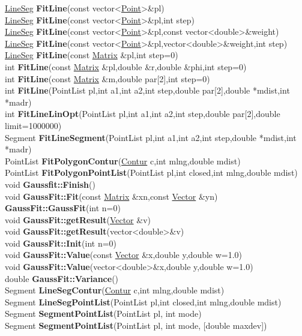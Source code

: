 \documentclass[10pt,titlepage]{article}
\def\functionlistentry#1#2#3#4#5#6{\noindent #1 {\bf #2}(#3) \dotfill #6\\}
\begin{document}
{{\functionlistentry{\hyperlink{LineSeg}{LineSeg}}{FitLine}{const vector\textless {}\hyperlink{Point}{Point}\textgreater  \&pl}{1159}{fitting}{}
\functionlistentry{\hyperlink{LineSeg}{LineSeg}}{FitLine}{const vector\textless {}\hyperlink{Point}{Point}\textgreater  \&pl,int step}{1160}{fitting}{}
\functionlistentry{\hyperlink{LineSeg}{LineSeg}}{FitLine}{const vector\textless {}\hyperlink{Point}{Point}\textgreater  \&pl,const vector\textless {}double\textgreater  \&weight}{1161}{fitting}{}
\functionlistentry{\hyperlink{LineSeg}{LineSeg}}{FitLine}{const vector\textless {}\hyperlink{Point}{Point}\textgreater  \&pl,vector\textless {}double\textgreater  \&weight,int step}{1162}{fitting}{}
\functionlistentry{\hyperlink{LineSeg}{LineSeg}}{FitLine}{const \hyperlink{Matrix}{Matrix} \&pl,int step=0}{1163}{fitting}{}
\functionlistentry{int}{FitLine}{const \hyperlink{Matrix}{Matrix} \&pl,double \&r,double \&phi,int step=0}{1164}{fitting}{}
\functionlistentry{int}{FitLine}{const \hyperlink{Matrix}{Matrix} \&m,double par[2],int step=0}{1165}{fitting}{}
\functionlistentry{int}{FitLine}{PointList pl,int a1,int a2,int step,double par[2],double *mdist,int *madr}{1166}{fitting}{}
\functionlistentry{int}{FitLineLinOpt}{PointList pl,int a1,int a2,int step,double par[2],double limit=1000000}{1167}{fitting}{}
\functionlistentry{Segment}{FitLineSegment}{PointList pl,int a1,int a2,int step,double *mdist,int *madr}{1181}{fitting}{}
\functionlistentry{PointList}{FitPolygonContur}{\hyperlink{Contur}{Contur} c,int mlng,double mdist}{1185}{fitting}{}
\functionlistentry{PointList}{FitPolygonPointList}{PointList pl,int closed,int mlng,double mdist}{1190}{fitting}{}
\functionlistentry{void}{Gaussfit::Finish}{}{1154}{fitting}{}
\functionlistentry{void}{GaussFit::Fit}{const \hyperlink{Matrix}{Matrix} \&xn,const \hyperlink{Vector}{Vector} \&yn}{1155}{fitting}{}
\functionlistentry{}{GaussFit::GaussFit}{int n=0}{1150}{fitting}{}
\functionlistentry{void}{GaussFit::getResult}{\hyperlink{Vector}{Vector} \&v}{1156}{fitting}{}
\functionlistentry{void}{GaussFit::getResult}{vector\textless {}double\textgreater  \&v}{1157}{fitting}{}
\functionlistentry{void}{GaussFit::Init}{int n=0}{1151}{fitting}{}
\functionlistentry{void}{GaussFit::Value}{const \hyperlink{Vector}{Vector} \&x,double y,double w=1.0}{1152}{fitting}{}
\functionlistentry{void}{GaussFit::Value}{vector\textless {}double\textgreater  \&x,double y,double w=1.0}{1153}{fitting}{}
\functionlistentry{double}{GaussFit::Variance}{}{1158}{fitting}{}
\functionlistentry{Segment}{LineSegContur}{\hyperlink{Contur}{Contur} c,int mlng,double mdist}{1184}{fitting}{}
\functionlistentry{Segment}{LineSegPointList}{PointList pl,int closed,int mlng,double mdist}{1189}{fitting}{}
\functionlistentry{Segment}{SegmentPointList}{PointList pl, int mode}{1186}{fitting}{}
\functionlistentry{Segment}{SegmentPointList}{PointList pl, int mode, [double maxdev]}{1187}{fitting}{}

}}
\end{document}
